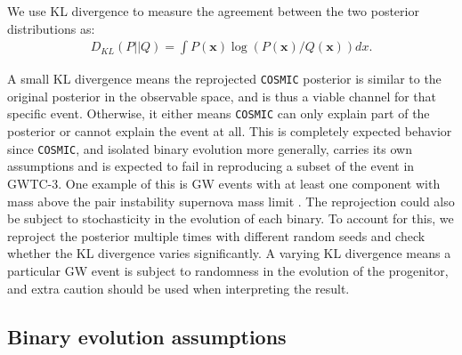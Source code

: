 \documentclass[linenumbers,twocolumn]{aastex631}
\begin{document}
We use KL divergence to measure the agreement between the two posterior
distributions as:
\begin{align}
D_{KL}(P||Q) = \int P(\bm{x}) \log(P(\bm{x})/Q(\bm{x})) dx.
\label{eq:KLdivergence}
\end{align}

\noindent A small KL divergence means the reprojected \texttt{COSMIC} posterior
is similar to the original posterior in the observable space, and is thus a
viable channel for that specific event. Otherwise, it either means
\texttt{COSMIC} can only explain part of the posterior or cannot explain the
event at all. This is completely expected behavior since \texttt{COSMIC}, and
isolated binary evolution more generally, carries its own assumptions and is
expected to fail in reproducing a subset of the event in GWTC-3. One example of
this is GW events with at least one component with mass above the pair
instability supernova mass limit \citep{Woosley2017, Farmer2019}. The
reprojection could also be subject to stochasticity in the evolution of each
binary. To account for this, we reproject the posterior multiple times with
different random seeds and check whether the KL divergence varies significantly.
A varying KL divergence means a particular GW event is subject to randomness in
the evolution of the progenitor, and extra caution should be used when
interpreting the result.

\subsection{\textbf{Binary evolution assumptions}}
\label{subsec:binaries}
\end{document}
